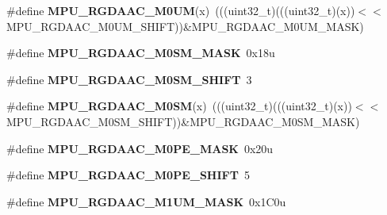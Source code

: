 \begin{DoxyCompactItemize}
\item 
\#define {\bfseries M\+P\+U\+\_\+\+R\+G\+D\+A\+A\+C\+\_\+\+M0\+UM}(x)~(((uint32\+\_\+t)(((uint32\+\_\+t)(x))$<$$<$M\+P\+U\+\_\+\+R\+G\+D\+A\+A\+C\+\_\+\+M0\+U\+M\+\_\+\+S\+H\+I\+FT))\&M\+P\+U\+\_\+\+R\+G\+D\+A\+A\+C\+\_\+\+M0\+U\+M\+\_\+\+M\+A\+SK)\hypertarget{group__MPU__Register__Masks_ga2f421e9034b369fd97dae1de41e03a5c}{}\label{group__MPU__Register__Masks_ga2f421e9034b369fd97dae1de41e03a5c}

\item 
\#define {\bfseries M\+P\+U\+\_\+\+R\+G\+D\+A\+A\+C\+\_\+\+M0\+S\+M\+\_\+\+M\+A\+SK}~0x18u\hypertarget{group__MPU__Register__Masks_gada28730c0d3bd624b681e09a736c120e}{}\label{group__MPU__Register__Masks_gada28730c0d3bd624b681e09a736c120e}

\item 
\#define {\bfseries M\+P\+U\+\_\+\+R\+G\+D\+A\+A\+C\+\_\+\+M0\+S\+M\+\_\+\+S\+H\+I\+FT}~3\hypertarget{group__MPU__Register__Masks_gadad72890c36bcb3eea5e72c8f95af64a}{}\label{group__MPU__Register__Masks_gadad72890c36bcb3eea5e72c8f95af64a}

\item 
\#define {\bfseries M\+P\+U\+\_\+\+R\+G\+D\+A\+A\+C\+\_\+\+M0\+SM}(x)~(((uint32\+\_\+t)(((uint32\+\_\+t)(x))$<$$<$M\+P\+U\+\_\+\+R\+G\+D\+A\+A\+C\+\_\+\+M0\+S\+M\+\_\+\+S\+H\+I\+FT))\&M\+P\+U\+\_\+\+R\+G\+D\+A\+A\+C\+\_\+\+M0\+S\+M\+\_\+\+M\+A\+SK)\hypertarget{group__MPU__Register__Masks_gac319d89383bf9f0de908508542fea331}{}\label{group__MPU__Register__Masks_gac319d89383bf9f0de908508542fea331}

\item 
\#define {\bfseries M\+P\+U\+\_\+\+R\+G\+D\+A\+A\+C\+\_\+\+M0\+P\+E\+\_\+\+M\+A\+SK}~0x20u\hypertarget{group__MPU__Register__Masks_ga9971bc4d5380405e3dfc5406f198467f}{}\label{group__MPU__Register__Masks_ga9971bc4d5380405e3dfc5406f198467f}

\item 
\#define {\bfseries M\+P\+U\+\_\+\+R\+G\+D\+A\+A\+C\+\_\+\+M0\+P\+E\+\_\+\+S\+H\+I\+FT}~5\hypertarget{group__MPU__Register__Masks_gaefb6130bf565012a5a2ed7137d9f2b11}{}\label{group__MPU__Register__Masks_gaefb6130bf565012a5a2ed7137d9f2b11}

\item 
\#define {\bfseries M\+P\+U\+\_\+\+R\+G\+D\+A\+A\+C\+\_\+\+M1\+U\+M\+\_\+\+M\+A\+SK}~0x1\+C0u\hypertarget{group__MPU__Register__Masks_ga9c612a4add9fc4bd1e8866fe06d5a0f0}{}\label{group__MPU__Register__Masks_ga9c612a4add9fc4bd1e8866fe06d5a0f0}


\end{DoxyCompactItemize}
